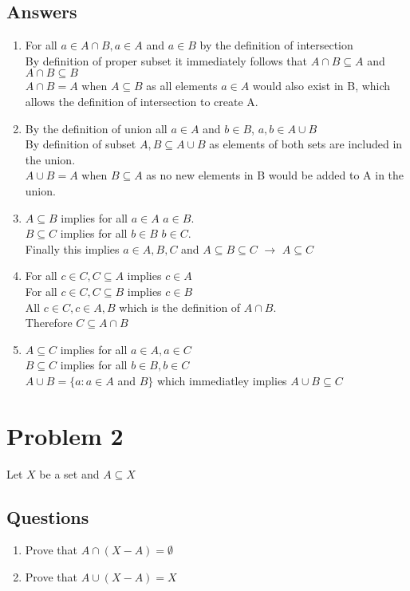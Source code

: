\documentclass{article}
\begin{document}
\subsection*{Answers}
\begin{enumerate}[label=\alph*]
\item For all \(a \in A \cap B, a \in A\) and \(a \in B\) by the definition of intersection \\ By definition of proper subset it immediately follows that \(A \cap B \subseteq A\) and \(A \cap B \subseteq B\) \\  \(A \cap B = A\) when \(A \subseteq B\) as all elements \(a \in A\) would also exist in B, which allows the definition of intersection to create A.
\item By the definition of union all \(a \in A\) and \(b \in B\), \(a,b \in A \cup B\) \\ By definition of subset \(A, B \subseteq A \cup B\) as elements of both sets are included in the union. \\ \(A \cup B = A\) when \(B \subseteq A\) as no new elements in B would be added to A in the union.
\item \(A \subseteq B\) implies for all \(a \in A\) \(a \in B\). \\ \(B \subseteq C\) implies for all \(b \in B\) \(b \in C\). \\ Finally this implies \(a \in A, B, C\) and \(A \subseteq B \subseteq C\) \(\rightarrow\) \(A \subseteq C\)
\item For all \(c \in C, C \subseteq A\) implies \(c \in A\) \\ For all \(c \in C, C \subseteq B\) implies \(c \in B\) \\ All \(c \in C, c \in A, B\) which is the definition of \(A \cap B\). \\ Therefore \(C \subseteq A \cap B\)
\item \(A \subseteq C \) implies for all \(a \in A, a \in C\) \\ \(B \subseteq C\) implies for all \(b \in B, b\in C\) \\ \(A \cup B = \{ a : a \in A\) and \(B\}\) which immediatley implies \(A \cup B \subseteq C\)
\end{enumerate}
\section*{Problem 2}
Let \(X\) be a set and \(A \subseteq X\)
\subsection*{Questions}
\begin{enumerate}[label=\alph*]
\item Prove that \(A \cap (X - A) = \emptyset \)
\item Prove that \(A \cup (X - A) = X\)
\end{enumerate}
\end{document}
